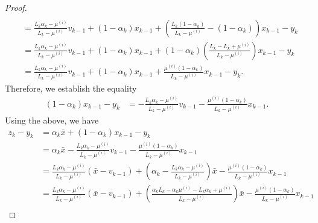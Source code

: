 \documentclass[12pt]{article}
\begin{document}
\begin{proof}
\begin{align*}
                \\
                &= \frac{L_k\alpha_k - \mu^{(i)}}{L_k - \mu^{(i)}} v_{k - 1} + (1 - \alpha_k)x_{k - 1}
                + 
                \left(
                    \frac{L_k(1 - \alpha_k)}{L_k - \mu^{(i)}} - (1 - \alpha_k)
                \right) x_{k - 1} - y_k
                \\
                &= \frac{L_k\alpha_k - \mu^{(i)}}{L_k - \mu^{(i)}} v_{k - 1} + (1 - \alpha_k)x_{k - 1}
                + 
                (1 - \alpha_k)\left(
                    \frac{L_k - L_k + \mu^{(i)}}{L_k - \mu^{(i)}}
                \right) x_{k - 1} - y_k
                \\
                &= \frac{L_k\alpha_k - \mu^{(i)}}{L_k - \mu^{(i)}} v_{k - 1} + (1 - \alpha_k)x_{k - 1}
                + 
                \frac{\mu^{(i)}(1 - \alpha_k)}{L_k - \mu^{(i)}}x_{k - 1} - y_k. 
            \end{align*}
            Therefore, we establish the equality 
            \begin{align*}
                (1 - \alpha_k)x_{k - 1} - y_k &= 
                - \frac{L_k\alpha_k - \mu^{(i)}}{L_k - \mu^{(i)}} v_{k - 1} 
                - \frac{\mu^{(i)}(1 - \alpha_k)}{L_k - \mu^{(i)}} x_{k - 1}. 
            \end{align*}
            Using the above, we have 
            \begin{align*}
                z_k - y_k &= 
                \alpha_k \bar x + (1 - \alpha_k)x_{k - 1} - y_k
                \\
                &= \alpha_k \bar x 
                - \frac{L_k\alpha_k - \mu^{(i)}}{L_k - \mu^{(i)}} v_{k - 1} 
                - \frac{\mu^{(i)}(1 - \alpha_k)}{L_k - \mu^{(i)}} x_{k - 1}
                \\
                &= \frac{L_k\alpha_k - \mu^{(i)}}{L_k - \mu^{(i)}}(\bar x - v_{k - 1})
                + \left(
                    \alpha_k - \frac{L_k\alpha_k - \mu^{(i)}}{L_k - \mu^{(i)}}
                \right)\bar x
                - \frac{\mu^{(i)}(1 - \alpha_k)}{L_k - \mu^{(i)}} x_{k - 1}
                \\
                &= \frac{L_k\alpha_k - \mu^{(i)}}{L_k - \mu^{(i)}}(\bar x - v_{k - 1})
                + \left(
                    \frac{\alpha_kL_k - \alpha_k \mu^{(i)} - L_k\alpha_k + \mu^{(i)}}{L_k - \mu^{(i)}}
                \right)\bar x
                - \frac{\mu^{(i)}(1 - \alpha_k)}{L_k - \mu^{(i)}} x_{k - 1}
                \\

\end{align*}
\end{proof}
\end{document}
